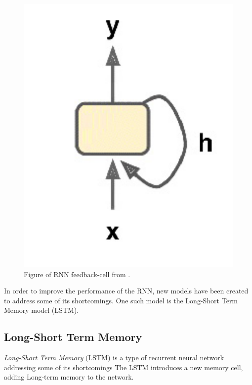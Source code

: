 \begin{figure}[h!]
    \centering
    \includegraphics[width=\textwidth]{./sections/BT/figures/RNN_neuron_hands_on.png}
    \hfill
    \caption{Figure of RNN feedback-cell from \cite[p.~472]{Geron2017}.}
    \label{fig:rnn-cell}
\end{figure}



In order to improve the performance of the RNN, new models have been created to address some of its shortcomings.
One such model is the Long-Short Term Memory model (LSTM).


\cite[p.~469-472]{Geron2017}


\subsection{Long-Short Term Memory}
\label{section:BT:LSTM}

\textit{Long-Short Term Memory} (LSTM) is a type of recurrent neural network addressing some of its shortcomings
The LSTM introduces a new memory cell, adding Long-term memory to the network.

